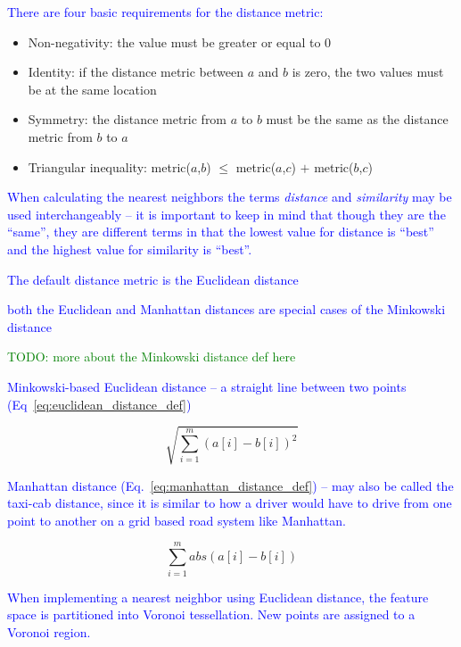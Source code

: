 \textcolor{blue}{There are four basic requirements for the distance metric:}

\begin{itemize}
	\item Non-negativity: the value must be greater or equal to 0
	\item Identity: if the distance metric between $a$ and $b$ is zero, the two values must be at the same location
	\item Symmetry: the distance metric from $a$ to $b$ must be the same as the distance metric from $b$ to $a$
	\item Triangular inequality: metric($a$,$b$) $\le$ metric($a$,$c$) $+$ metric($b$,$c$)
\end{itemize}

\textcolor{blue}{When calculating the nearest neighbors the terms \textit{distance} and \textit{similarity} may be used interchangeably -- it is important to keep in mind that though they are the ``same'', they are different terms in that the lowest value for distance is ``best'' and the highest value for similarity is ``best''.}

\textcolor{blue}{The default distance metric is the Euclidean distance}

\textcolor{blue}{both the Euclidean and Manhattan distances are special cases of the Minkowski distance}

\textcolor{green}{TODO: more about the Minkowski distance def here}

\textcolor{blue}{Minkowski-based Euclidean distance -- a straight line between two points (Eq~\ref{eq:euclidean_distance_def})}

\begin{equation}
{\sqrt{\sum_{i=1}^{m}{{(a[i] - b[i])}^2}}}
\label{eq:euclidean_distance_def}
\end{equation}


\textcolor{blue}{Manhattan distance (Eq.~\ref{eq:manhattan_distance_def}) -- may also be called the taxi-cab distance, since it is similar to how a driver would have to drive from one point to another on a grid based road system like Manhattan.}

\begin{equation}
{\sum_{i=1}^{m}{abs(a[i] - b[i])}}
\label{eq:manhattan_distance_def}
\end{equation}

\textcolor{blue}{When implementing a nearest neighbor using Euclidean distance, the feature space is partitioned into {Voronoi tessellation}. New points are assigned to a {Voronoi region}.}

